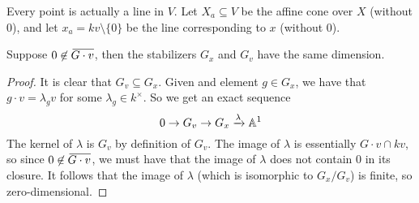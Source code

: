 Every point is actually a line in $V$. Let $X_a\subseteq V$ be the affine cone over $X$ (without 0), and let $x_a=kv\setminus \{0\}$ be the line corresponding to $x$ (without $0$). 
\begin{lemma}
 Suppose $0\not\in \bbar{G\cdot v}$, then the stabilizers $G_x$ and $G_v$ have the same dimension.
\end{lemma}
\begin{proof}
 It is clear that $G_v\subseteq G_x$. Given and element $g\in G_x$, we have that $g\cdot v=\lambda_g v$ for some $\lambda_g\in k^\times$. So we get an exact sequence
 \[
  0\to G_v \to G_x\xrightarrow\lambda \AA^1
 \]
 The kernel of $\lambda$ is $G_v$ by definition of $G_v$. The image of $\lambda$ is essentially $G\cdot v \cap kv$, so since $0\not\in \bbar{G\cdot v}$, we must have that the image of $\lambda$ does not contain $0$ in its closure. It follows that the image of $\lambda$ (which is isomorphic to $G_x/G_v$) is finite, so zero-dimensional.
\end{proof}


